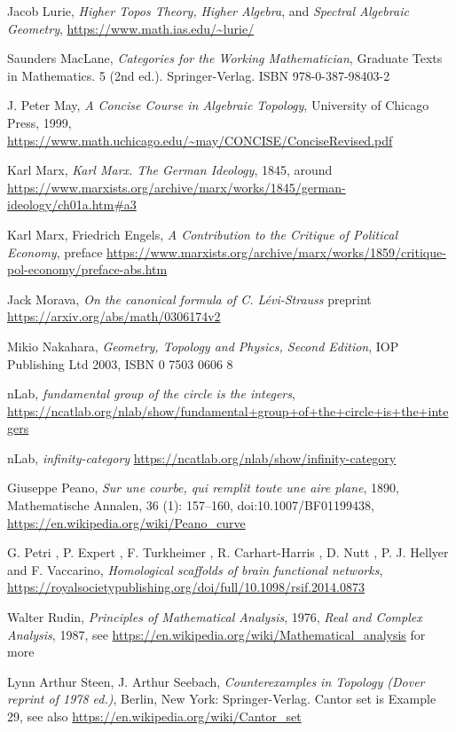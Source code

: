 \documentclass{article}
\begin{document}
\begin{thebibliography}{99}
 Jacob Lurie, \textit{Higher Topos Theory,} \textit{Higher Algebra}, and \textit{Spectral Algebraic Geometry}, \url{https://www.math.ias.edu/~lurie/}


 Saunders MacLane, \textit{Categories for the Working Mathematician}, Graduate Texts in Mathematics. 5 (2nd ed.). Springer-Verlag. ISBN 978-0-387-98403-2

 J. Peter May, \textit{A Concise Course in Algebraic Topology}, University of Chicago Press, 1999, \url{https://www.math.uchicago.edu/~may/CONCISE/ConciseRevised.pdf}

 Karl Marx, \textit{Karl Marx. The German Ideology}, 1845, around \url{https://www.marxists.org/archive/marx/works/1845/german-ideology/ch01a.htm#a3}

 Karl Marx, Friedrich Engels, \textit{A Contribution to the Critique of Political Economy}, preface \url{https://www.marxists.org/archive/marx/works/1859/critique-pol-economy/preface-abs.htm}

 Jack Morava, \textit{On the canonical formula of C. L\'evi-Strauss} preprint \url{https://arxiv.org/abs/math/0306174v2}

 Mikio Nakahara, \textit{Geometry, Topology and Physics, Second Edition}, IOP Publishing Ltd 2003, ISBN 0 7503 0606 8

 nLab, \textit{fundamental group of the circle is the integers}, \url{https://ncatlab.org/nlab/show/fundamental+group+of+the+circle+is+the+integers}

 nLab, \textit{infinity-category} \url{https://ncatlab.org/nlab/show/infinity-category}

 Giuseppe Peano, \textit{Sur une courbe, qui remplit toute une aire plane}, 1890, Mathematische Annalen, 36 (1): 157–160, doi:10.1007/BF01199438, \url{https://en.wikipedia.org/wiki/Peano_curve}

 G. Petri , P. Expert , F. Turkheimer , R. Carhart-Harris , D. Nutt , P. J. Hellyer and F. Vaccarino, \textit{Homological scaffolds of brain functional networks}, \url{https://royalsocietypublishing.org/doi/full/10.1098/rsif.2014.0873}

 Walter Rudin, \textit{Principles of Mathematical Analysis}, 1976, \textit{Real and Complex Analysis}, 1987, see \url{https://en.wikipedia.org/wiki/Mathematical_analysis} for more

 Lynn Arthur Steen, J. Arthur Seebach, \textit{Counterexamples in Topology (Dover reprint of 1978 ed.)}, Berlin, New York: Springer-Verlag. Cantor set is Example 29, see also \url{https://en.wikipedia.org/wiki/Cantor_set}



\end{thebibliography}
\end{document}
